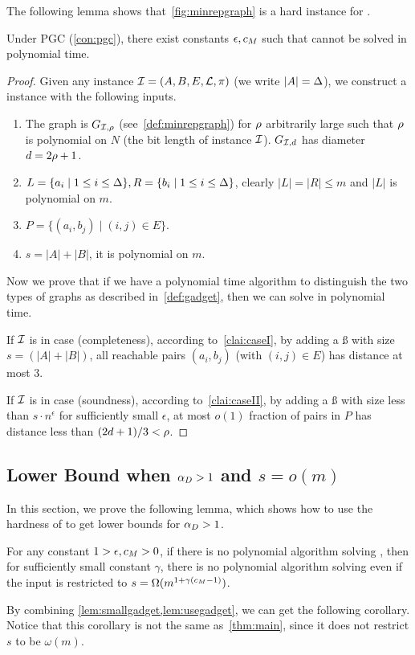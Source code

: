 The following lemma shows that~\cref{fig:minrepgraph} is a hard instance for \gadget{\cs{}}{\epsilon}.
\begin{lemma}\label{lem:smallgadget}
	Under PGC (\cref{con:pgc}), there exist constants $\epsilon,c_M{}$ such that \gadget{\cs{}}{\epsilon} cannot be solved in polynomial time.
	
\end{lemma}
\begin{proof}
	Given any \labcov{} instance $\mathcal{I}=(A,B,E,\mathcal{L},\pi)$ (we write $|A|=\Delta$), we construct a \gadget{\cs{}}{\epsilon} instance with the following inputs.
	\begin{enumerate}
		\item The graph is $G_{\mathcal{I},\mathcal{\rho}{}}$ (see~\cref{def:minrepgraph}) for $\mathcal{\rho}{}$ arbitrarily large such that $\mathcal{\rho}{}$ is polynomial on $N$ (the bit length of instance $\mathcal{I}$). $G_{\mathcal{I},d}$ has diameter $d=2\mathcal{\rho}{}+1$.
		\item $L=\{a_i\mid 1\le i\le \Delta\},R=\{b_i\mid 1\le i\le \Delta\}$, clearly $|L|=|R|\le m$ and $|L|$ is polynomial on $m$.
		\item $P=\{(a_i,b_j)\mid (i,j)\in E\}$.
		\item $s=|A|+|B|$, it is polynomial on $m$.
	\end{enumerate}
	
	Now we prove that if we have a polynomial time algorithm to distinguish the two types of graphs as described in~\cref{def:gadget}, then we can solve \labcov{} in polynomial time.
	
	If $\mathcal{I}$ is in case (completeness), according to~\cref{clai:caseI}, by adding a \ss{} with size $s=(|A|+|B|)$, all reachable pairs $(a_i,b_j)$ (with $(i,j)\in E$) has distance at most 3. 
 
 If $\mathcal{I}$ is in case (soundness), according to~\cref{clai:caseII}, by adding a \ss{} with size less than $s\cdot n^{\epsilon}$ for sufficiently small $\epsilon$, at most $o(1)$ fraction of pairs in $P$ has distance less than $(2d+1)/3<\mathcal{\rho}{}$. 
\end{proof}

\subsection{Lower Bound when \texorpdfstring{$\alpha_D>1$}{apxDge1} and \texorpdfstring{$s=o(m)$}{0<cs<1}}\label{subsec:bicriterialower}
In this section, we prove the following lemma, which shows how to use the hardness of \gadget{\cs{}}{\epsilon} to get lower bounds for $\alpha_D>1$.
\begin{lemma}\label{lem:usegadget}
	For any constant $1>\epsilon,c_M{}>0$, if there is no polynomial algorithm solving \gadget{\cs{}}{\epsilon}, then for sufficiently small constant $\gamma$, there is no polynomial algorithm solving  even if the input is restricted to $s=\Omega(m^{1+\gamma(c_M{}-1)})$.
	
\end{lemma}
By combining \cref{lem:smallgadget,lem:usegadget}, we can get the following corollary. Notice that this corollary is not the same as~\cref{thm:main}, since it does not restrict $s$ to be $\omega(m)$.

